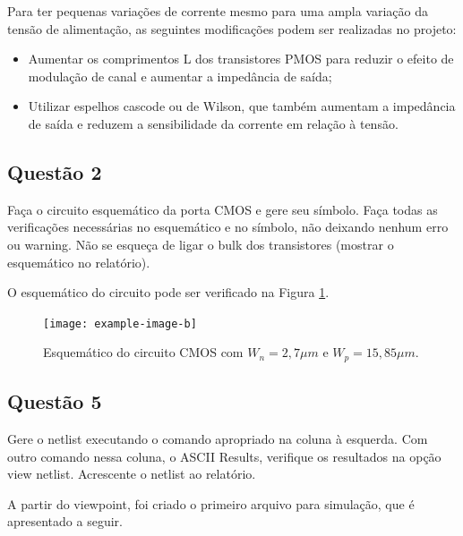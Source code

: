 \documentclass[12pt,a4paper]{article}
\begin{document}
Para ter pequenas variações de corrente mesmo para uma ampla variação da tensão de alimentação, as seguintes modificações podem ser realizadas no projeto:

\begin{itemize}
    \item Aumentar os comprimentos L dos transistores PMOS para reduzir o efeito de modulação de canal e aumentar a impedância de saída;
    \item Utilizar espelhos cascode ou de Wilson, que também aumentam a impedância de saída e reduzem a sensibilidade da corrente em relação à tensão.
\end{itemize}

\subsection*{Questão 2}

Faça o circuito esquemático da porta CMOS e gere seu símbolo. Faça todas as verificações necessárias no esquemático e no símbolo, não deixando nenhum erro ou warning. Não se esqueça de ligar o bulk dos transistores (mostrar o esquemático no relatório).

O esquemático do circuito pode ser verificado na Figura \ref{fig:cmos_schematic}.

\begin{figure}[H]
    \centering
    \texttt{[image: example-image-b]}
    \caption{Esquemático do circuito CMOS com $W_n = 2,7 \mu m$ e $W_p = 15,85 \mu m$.}
    \label{fig:cmos_schematic}
\end{figure}

\subsection*{Questão 5}

Gere o netlist executando o comando apropriado na coluna à esquerda. Com outro comando nessa coluna, o ASCII Results, verifique os resultados na opção view netlist. Acrescente o netlist ao relatório.

A partir do viewpoint, foi criado o primeiro arquivo para simulação, que é apresentado a seguir.

\end{document}
